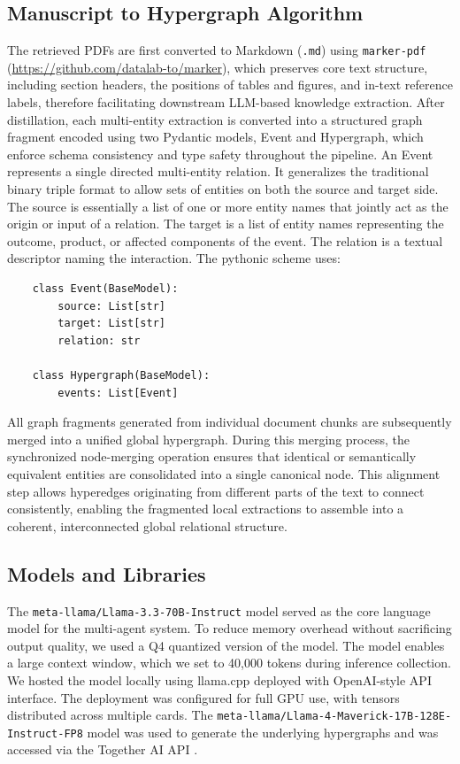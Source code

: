 \documentclass{article}
\begin{document}
\subsection{Manuscript to Hypergraph Algorithm} 
The retrieved PDFs are first converted to Markdown (\texttt{.md}) using \texttt{marker-pdf} (\url{https://github.com/datalab-to/marker}), which preserves core text structure, including section headers, the positions of tables and figures, and in-text reference labels, therefore facilitating downstream LLM-based knowledge extraction. After distillation, each multi-entity extraction is converted into a structured graph fragment encoded using two Pydantic models, Event and Hypergraph, which enforce schema consistency and type safety throughout the pipeline. An Event represents a single directed multi-entity relation. It generalizes the traditional binary triple format to allow sets of entities on both the source and target side. The source is essentially a list of one or more entity names that jointly act as the origin or input of a relation. The target is a list of entity names representing the outcome, product, or affected components of the event. The relation is a textual descriptor naming the interaction. 
%
The pythonic scheme uses: 

\begin{verbatim}
    class Event(BaseModel):
        source: List[str]
        target: List[str]
        relation: str 
    
    class Hypergraph(BaseModel):
        events: List[Event]
\end{verbatim}

All graph fragments generated from individual document chunks are subsequently merged into a unified global hypergraph. During this merging process, the synchronized node-merging operation ensures that identical or semantically equivalent entities are consolidated into a single canonical node. This alignment step allows hyperedges originating from different parts of the text to connect consistently, enabling the fragmented local extractions to assemble into a coherent, interconnected global relational structure.

\subsection{Models and Libraries}

The \texttt{meta-llama/Llama-3.3-70B-Instruct} model \cite{llama3modelcard} served as the core language model for the multi-agent system. To reduce memory overhead without sacrificing output quality, we used a Q4 quantized version of the model. The model enables a large context window, which we set to 40,000 tokens during inference collection. We hosted the model locally using llama.cpp \cite{gerganov2023llamacpp} deployed with OpenAI-style API interface. The deployment was configured for full GPU use, with tensors distributed across multiple cards. The \texttt{meta-llama/Llama-4-Maverick-17B-128E-Instruct-FP8} model \cite{llama3modelcard} was used to generate the underlying hypergraphs and was accessed via the Together AI API \cite{togetherai}. 
\end{document}
